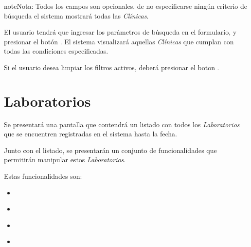 \documentclass[a4paper,10pt,spanish]{sphinxmanual}
\begin{document}
\begin{notice}{note}{Nota:}
Todos los campos son opcionales, de no especificarse ningún criterio de búsqueda el sistema mostrará todas las \emph{Clínicas}.
\end{notice}

El usuario tendrá que ingresar los parámetros de búsqueda en el formulario, y presionar el botón . El sistema visualizará aquellas \emph{Clínicas} que cumplan con todas las condiciones especificadas.

Si el usuario desea limpiar los filtros activos, deberá presionar el boton .



\section{Laboratorios}
\label{laboratorios::doc}\label{laboratorios:laboratorios}
Se presentará una pantalla que contendrá un listado con todos los \emph{Laboratorios} que se encuentren registradas en el sistema hasta la fecha.


Junto con el listado, se presentarán un conjunto de funcionalidades que permitirán manipular estos \emph{Laboratorios}.

Estas funcionalidades son:
\begin{itemize}
\item {} 
{\hyperref[laboratorios:alta\string-laboratorio]{}}

\item {} 
{\hyperref[laboratorios:modificar\string-laboratorio]{}}

\item {} 
{\hyperref[laboratorios:eliminar\string-laboratorio]{}}

\item {} 
{\hyperref[laboratorios:formulario\string-busqueda\string-laboratorio]{}}

\end{itemize}
\end{document}
